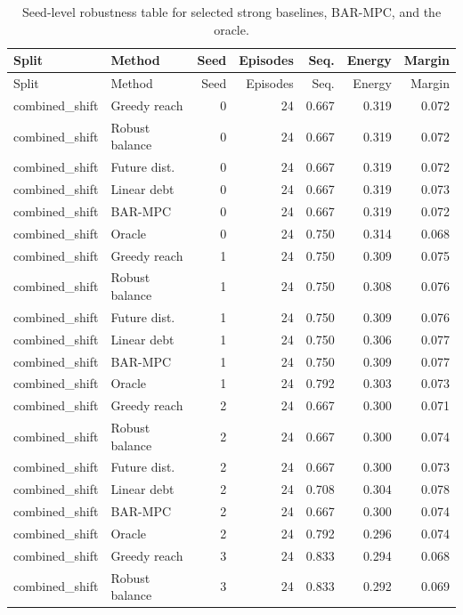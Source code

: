 \begin{longtable}{llrrrrr}
\caption{Seed-level robustness table for selected strong baselines, BAR-MPC, and the oracle.}\label{tab:seed-metrics}\\
\toprule
Split & Method & Seed & Episodes & Seq. & Energy & Margin \\
\midrule
\endfirsthead
\toprule
Split & Method & Seed & Episodes & Seq. & Energy & Margin \\
\midrule
\endhead
combined\_shift & Greedy reach & 0 & 24 & 0.667 & 0.319 & 0.072 \\
combined\_shift & Robust balance & 0 & 24 & 0.667 & 0.319 & 0.072 \\
combined\_shift & Future dist. & 0 & 24 & 0.667 & 0.319 & 0.072 \\
combined\_shift & Linear debt & 0 & 24 & 0.667 & 0.319 & 0.073 \\
combined\_shift & BAR-MPC & 0 & 24 & 0.667 & 0.319 & 0.072 \\
combined\_shift & Oracle & 0 & 24 & 0.750 & 0.314 & 0.068 \\
combined\_shift & Greedy reach & 1 & 24 & 0.750 & 0.309 & 0.075 \\
combined\_shift & Robust balance & 1 & 24 & 0.750 & 0.308 & 0.076 \\
combined\_shift & Future dist. & 1 & 24 & 0.750 & 0.309 & 0.076 \\
combined\_shift & Linear debt & 1 & 24 & 0.750 & 0.306 & 0.077 \\
combined\_shift & BAR-MPC & 1 & 24 & 0.750 & 0.309 & 0.077 \\
combined\_shift & Oracle & 1 & 24 & 0.792 & 0.303 & 0.073 \\
combined\_shift & Greedy reach & 2 & 24 & 0.667 & 0.300 & 0.071 \\
combined\_shift & Robust balance & 2 & 24 & 0.667 & 0.300 & 0.074 \\
combined\_shift & Future dist. & 2 & 24 & 0.667 & 0.300 & 0.073 \\
combined\_shift & Linear debt & 2 & 24 & 0.708 & 0.304 & 0.078 \\
combined\_shift & BAR-MPC & 2 & 24 & 0.667 & 0.300 & 0.074 \\
combined\_shift & Oracle & 2 & 24 & 0.792 & 0.296 & 0.074 \\
combined\_shift & Greedy reach & 3 & 24 & 0.833 & 0.294 & 0.068 \\
combined\_shift & Robust balance & 3 & 24 & 0.833 & 0.292 & 0.069 \\

\end{longtable}
